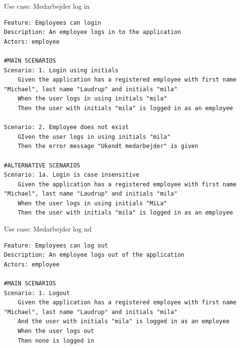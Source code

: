 \begin{listing}[H]
    \centering
    \caption{Use case: Medarbejder log in}\label{lst:usecase_login}
    \begin{verbatim}  
Feature: Employees can login
Description: An employee logs in to the application
Actors: employee

#MAIN SCENARIOS
Scenario: 1. Login using initials
    Given the application has a registered employee with first name "Michael", last name "Laudrup" and initials "mila"
    When the user logs in using initials "mila" 
    Then the user with initials "mila" is logged in as an employee

Scenario: 2. Employee does not exist
    GIven the user logs in using initials "mila" 
    Then the error message "Ukendt medarbejder" is given

#ALTERNATIVE SCENARIOS
Scenario: 1a. Login is case insensitive
    Given the application has a registered employee with first name "Michael", last name "Laudrup" and initials "mila"
    When the user logs in using initials "MiLa" 
    Then the user with initials "mila" is logged in as an employee
    \end{verbatim}
\end{listing}
\begin{listing}[H]
    \centering
    \caption{Use case: Medarbejder log ud}\label{lst:usecase_logout}
    \begin{verbatim}  
Feature: Employees can log out
Description: An employee logs out of the application
Actors: employee

#MAIN SCENARIOS
Scenario: 1. Logout
    Given the application has a registered employee with first name "Michael", last name "Laudrup" and initials "mila"
    And the user with initials "mila" is logged in as an employee
    When the user logs out
    Then none is logged in
    \end{verbatim}
\end{listing}
